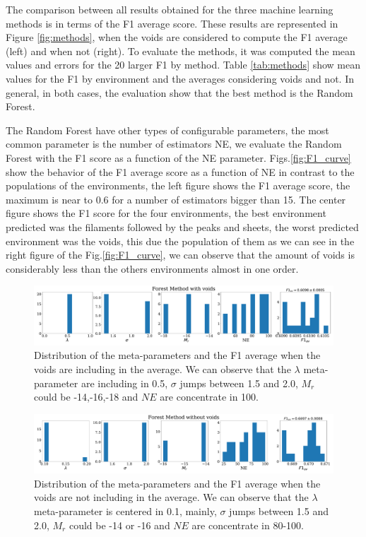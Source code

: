 \documentclass[usenatbib]{mnras}
\begin{document}
The comparison between all results obtained for the three machine learning methods is in terms of the F1 average score. These results are represented in Figure \ref{fig:methods}, when the voids are considered to compute the F1 average (left) and when not (right). 
To evaluate the methods, it was computed the mean values and errors for the 20 larger F1 by method. Table \ref{tab:methods} show mean values for the F1 by environment and the averages considering voids and not.
In general, in both cases, the evaluation show that the best method is the Random Forest. 

The Random Forest have other types of configurable parameters, the most common parameter is the number of estimators NE, we evaluate the Random Forest with the F1 score as a function of the NE parameter. 
Figs.\ref{fig:F1_curve} show the behavior of the F1 average score as a function of NE in contrast to the populations of the environments,
the left figure shows the F1 average score,
the maximum is near to 0.6 for a number of estimators bigger than 15.
The center figure shows the F1 score for the four environments,
the best environment predicted was the filaments followed by the peaks and sheets,
the worst predicted environment was the voids,
this due the population of them as we can see in the right figure of the Fig.\ref{fig:F1_curve},
we can observe that the amount of voids is considerably less than the others environments almost in one order.

\begin{figure}
\centering
    \includegraphics[scale=0.23]{Figs/p_features_Forest_F1_av.pdf}
    \caption{Distribution of the meta-parameters and the F1 average when the voids are including in the average. We can observe that the $\lambda$ meta-parameter are including in 0.5, $\sigma$ jumps between 1.5 and 2.0, $M_r$ could be -14,-16,-18 and $NE$ are concentrate in 100.}
    \label{fig:features_void}    
\end{figure}

\begin{figure}
\centering
    \includegraphics[scale=0.23]{Figs/p_features_Forest_F1_av_no_voids.pdf}
    \caption{Distribution of the meta-parameters and the F1 average when the voids are not including in the average. We can observe that the $\lambda$ meta-parameter is centered in 0.1, mainly, $\sigma$ jumps between 1.5 and 2.0, $M_r$ could be -14 or -16 and $NE$ are concentrate in 80-100.}
    \label{fig:features_no_void}    
\end{figure}
\end{document}
